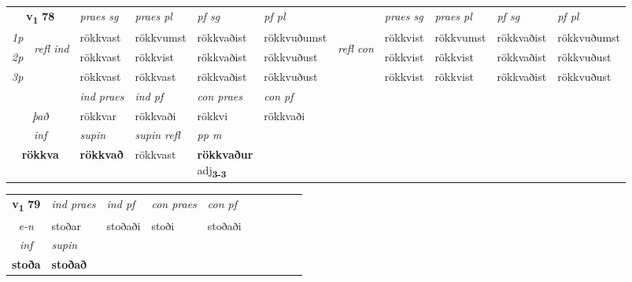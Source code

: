 \noindent
\begin{tabular}{lllllllllll} \toprule
\multicolumn{2}{c}{\textbf{v{\textsubscript{1}}} \Large{\textbf{78}}}  &  \textit{praes sg}  & \textit{praes pl}  &\textit{ pf sg} & \textit{pf pl} &  &  \textit{praes sg}  & \textit{praes pl}  & \textit{pf sg} & \textit{pf pl } \\*
	\cmidrule{3-6} \cmidrule{8-11}
 {\textit{1p}} & \multirow{3}{*}{\begin{turn}{90}\textit{refl ind}\end{turn}}  & rökkvast & rökkvumst & rökkvaðist & rökkvuðumst & \multirow{3}{*}{\begin{turn}{90}\textit{refl con}\end{turn}}  &rökkvist & rökkvumst & rökkvaðist & rökkvuðumst \\*
 {\textit{2p}} &  & rökkvast & rökkvist & rökkvaðist & rökkvuðust & &rökkvist & rökkvist & rökkvaðist & rökkvuðust \\*
 {\textit{3p}}  & & rökkvast & rökkvast & rökkvaðist & rökkvuðust & & rökkvist & rökkvist& rökkvaðist & rökkvuðust \\*
\cmidrule{3-6} \cmidrule{8-11}

   & &  \textit{ind praes} & \textit{ind pf} & \textit{con praes} & \textit{con pf} \\*
\multicolumn{2}{c}{ \textit{það} } & rökkvar & rökkvaði & rökkvi & rökkvaði \\*

\cmidrule{3-5}
   \multicolumn{2}{c}{\textit{inf}}      & \textit{supin} & \textit{supin refl} & \textit{pp m} \\*
  \multicolumn{2}{c}{\textbf{rökkva}}       &  \textbf{rökkvað} & rökkvast & \specialcell{\textbf{rökkvaður} \\ adj\textbf{\textsubscript{3-3}}} \\*
\end{tabular}

\noindent
\begin{tabular}{lllllllllll} \toprule
\multicolumn{2}{c}{\textbf{v{\textsubscript{1}}} \Large{\textbf{79}}}  &  \textit{ind praes} & \textit{ind pf} & \textit{con praes} & \textit{con pf} \\*
\multicolumn{2}{c}{ \textit{e-n} } & stoðar & stoðaði & stoði & stoðaði \\*

\cmidrule{3-3}
   \multicolumn{2}{c}{\textit{inf}}      & \textit{supin}   \\*
  \multicolumn{2}{c}{\textbf{stoða}}       &  \textbf{stoðað}   \\*
\end{tabular}

